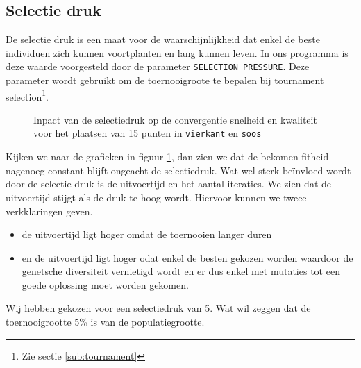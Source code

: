 \subsection{Selectie druk}
De selectie druk is een maat voor de waarschijnlijkheid dat enkel de beste individuen zich kunnen voortplanten en lang kunnen leven. In ons programma is deze waarde voorgesteld door de parameter \texttt{SELECTION\_PRESSURE}. Deze parameter wordt gebruikt om de toernooigroote te bepalen bij tournament selection\footnote{Zie sectie \ref{sub:tournament}}.
\begin{figure}[H]


\caption{Inpact van de selectiedruk op de convergentie snelheid en kwaliteit voor het plaatsen van 15 punten in \texttt{vierkant} en \texttt{soos}}
\label{graf:selectionPressure}
\end{figure}
Kijken we naar de grafieken in figuur \ref{graf:selectionPressure}, dan zien we dat de bekomen fitheid nagenoeg constant blijft ongeacht de selectiedruk. Wat wel sterk beïnvloed wordt door de selectie druk is de uitvoertijd en het aantal iteraties. We zien dat de uitvoertijd stijgt als de druk te hoog wordt. Hiervoor kunnen we tweee verkklaringen geven. \begin{itemize}\item de uitvoertijd ligt hoger omdat de toernooien langer duren \item en de uitvoertijd ligt hoger odat enkel de besten gekozen worden waardoor de genetsche diversiteit vernietigd wordt en er dus enkel met mutaties tot een goede oplossing moet worden gekomen.\end{itemize}

Wij hebben gekozen voor een selectiedruk van 5. Wat wil zeggen dat de toernooigrootte 5\% is van de populatiegrootte.


